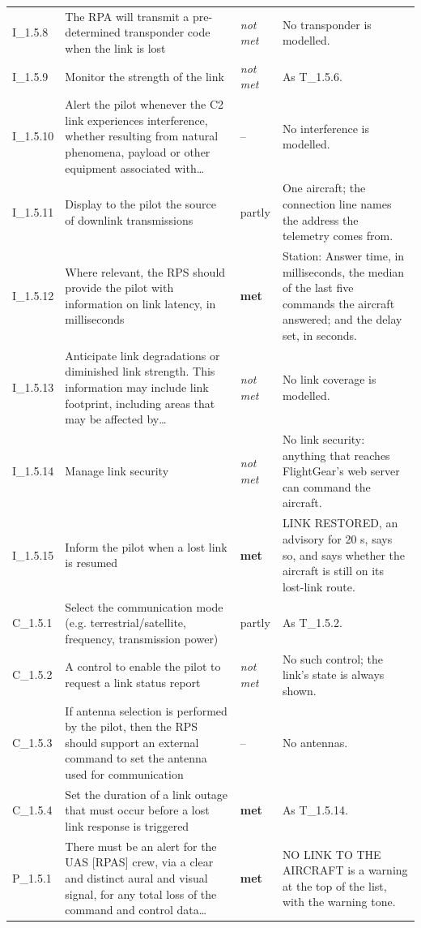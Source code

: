\begin{longtable}{@{}>{\raggedright\arraybackslash}p{12mm}>{\raggedright\arraybackslash}p{57mm}>{\raggedright\arraybackslash}p{13mm}>{\raggedright\arraybackslash}p{70mm}@{}}
I\_1.5.8 & The RPA will transmit a pre-determined transponder code when the link is lost & \emph{not met} & No transponder is modelled. \\
I\_1.5.9 & Monitor the strength of the link & \emph{not met} & As T\_1.5.6. \\
I\_1.5.10 & Alert the pilot whenever the C2 link experiences interference, whether resulting from natural phenomena, payload or other equipment associated with\ldots{} & -- & No interference is modelled. \\
I\_1.5.11 & Display to the pilot the source of downlink transmissions & partly & One aircraft; the connection line names the address the telemetry comes from. \\
I\_1.5.12 & Where relevant, the RPS should provide the pilot with information on link latency, in milliseconds & \textbf{met} & Station: Answer time, in milliseconds, the median of the last five commands the aircraft answered; and the delay set, in seconds. \\
I\_1.5.13 & Anticipate link degradations or diminished link strength. This information may include link footprint, including areas that may be affected by\ldots{} & \emph{not met} & No link coverage is modelled. \\
I\_1.5.14 & Manage link security & \emph{not met} & No link security: anything that reaches FlightGear's web server can command the aircraft. \\
I\_1.5.15 & Inform the pilot when a lost link is resumed & \textbf{met} & LINK RESTORED, an advisory for 20 s, says so, and says whether the aircraft is still on its lost-link route. \\
C\_1.5.1 & Select the communication mode (e.g. terrestrial/satellite, frequency, transmission power) & partly & As T\_1.5.2. \\
C\_1.5.2 & A control to enable the pilot to request a link status report & \emph{not met} & No such control; the link's state is always shown. \\
C\_1.5.3 & If antenna selection is performed by the pilot, then the RPS should support an external command to set the antenna used for communication & -- & No antennas. \\
C\_1.5.4 & Set the duration of a link outage that must occur before a lost link response is triggered & \textbf{met} & As T\_1.5.14. \\
P\_1.5.1 & There must be an alert for the UAS [RPAS] crew, via a clear and distinct aural and visual signal, for any total loss of the command and control data\ldots{} & \textbf{met} & NO LINK TO THE AIRCRAFT is a warning at the top of the list, with the warning tone. \\

\end{longtable}
